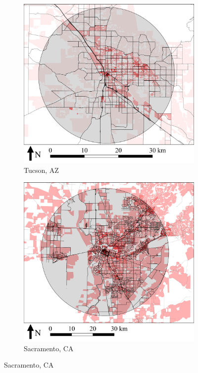 \documentclass{elsarticle}\usepackage[]{graphicx}\usepackage[]{color}
\begin{document}
\pagebreak
\begin{figure}[H]
     \centering
     \begin{subfigure}[b]{0.49\textwidth}
         \centering
		 \includegraphics[width=\textwidth]{tuc_vicmap}
        \caption{Tucson, AZ}
         \label{fig:tucmap}
     \end{subfigure}
          \hfill             
     \begin{subfigure}[b]{0.49\textwidth}
         \centering
		 \includegraphics[width=\textwidth]{sac_vicmap}
        \caption{Sacramento, CA}
         \label{fig:sacmap}
     \end{subfigure}
       

\end{figure}
\end{document}
